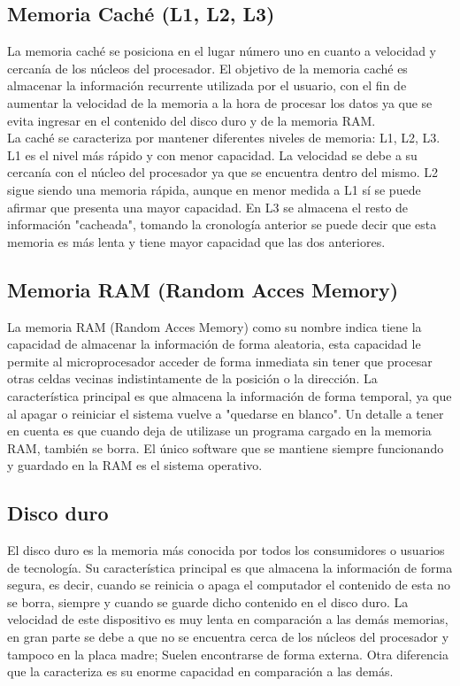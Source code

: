 \documentclass{article}
\begin{document}
\subsection{Memoria Caché (L1, L2, L3)}
\noindent
La memoria caché se posiciona en el lugar número uno en cuanto a velocidad y cercanía de los núcleos del procesador. El objetivo de la memoria caché es almacenar la información recurrente utilizada por el usuario, con el fin de aumentar la velocidad de la memoria a la hora de procesar los datos ya que se evita ingresar en el contenido del disco duro y de la memoria RAM.\\
\noindent
La caché se caracteriza por mantener diferentes niveles de memoria: L1, L2, L3.
L1 es el nivel más rápido y con menor capacidad. La velocidad se debe a su cercanía con el núcleo del procesador ya que se encuentra dentro del mismo.
L2 sigue siendo una memoria rápida, aunque en menor medida a L1 sí se puede afirmar que presenta una mayor capacidad.
En L3 se almacena el resto de información "cacheada", tomando la cronología anterior se puede decir que esta memoria es más lenta y tiene mayor capacidad que las dos anteriores.

\subsection{Memoria RAM (Random Acces Memory)}
\noindent
La memoria RAM (Random Acces Memory) como su nombre indica tiene la capacidad de almacenar la información de forma aleatoria, esta capacidad le permite al microprocesador acceder de forma inmediata sin tener que procesar otras celdas vecinas indistintamente de la posición o la dirección. 
La característica principal es que almacena la información de forma temporal, ya que al apagar o reiniciar el sistema vuelve a "quedarse en blanco".
Un detalle a tener en cuenta es que cuando deja de utilizase un programa cargado en la memoria RAM, también se borra. El único software que se mantiene siempre funcionando y guardado en la RAM es el sistema operativo.

\subsection{Disco duro}
\noindent
El disco duro es la memoria más conocida por todos los consumidores o usuarios de tecnología. Su característica principal es que almacena la información de forma segura, es decir, cuando se reinicia o apaga el computador el contenido de esta no se borra, siempre y cuando se guarde dicho contenido en el disco duro.
La velocidad de este dispositivo es muy lenta en comparación a las demás memorias, en gran parte se debe a que no se encuentra cerca de los núcleos del procesador y tampoco en la placa madre; Suelen encontrarse de forma externa. Otra diferencia que la caracteriza es su enorme capacidad en comparación a las demás.
\end{document}
